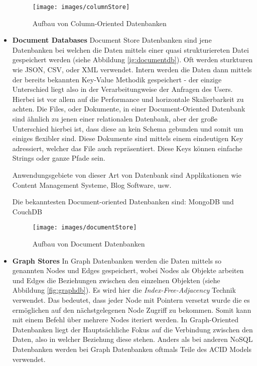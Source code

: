 \begin{itemize}
	\begin{figure}[h]\centering
		\texttt{[image: images/columnStore]}
		\caption{Aufbau von Column-Oriented Datenbanken}
		\label{fig:columnstore}
	\end{figure}


	\item \textbf{Document Databases\newline}
	Document Store Datenbanken sind jene Datenbanken bei welchen die Daten mittels einer quasi strukturiereten Datei gespeichert werden (siehe Abbildung \ref{ig:documentdb}). Oft werden sturkturen wie JSON, CSV, oder XML verwendet. Intern werden die Daten dann mittels der bereits bekannten Key-Value Methodik gespeichert - der einzige Unterschied liegt also in der Verarbeitungweise der Anfragen des Users. Hierbei ist vor allem auf die Performance und horizontale Skalierbarkeit zu achten. Die Files, oder Dokumente, in einer Document-Oriented Datenbank sind ähnlich zu jenen einer relationalen Datenbank, aber der große Unterschied hierbei ist, dass diese an kein Schema gebunden und somit um einiges flexibler sind. Diese Dokumente sind mittels einem eindeutigen Key adressiert, welcher das File auch repräsentiert. Diese Keys können einfache Strings oder ganze Pfade sein.

	Anwendungsgebiete von dieser Art von Datenbank sind Applikationen wie Content Management Systeme, Blog Software, usw. 

	Die bekanntesten Document-oriented Datenbanken sind: MongoDB und CouchDB

	\begin{figure}[h]\centering
		\texttt{[image: images/documentStore]}
		\caption{Aufbau von Document Datenbanken}
		\label{fig:documentdb}
	\end{figure}

	\clearpage

	\item \textbf{Graph Stores\newline}
	In Graph Datenbanken werden die Daten mittels so genannten Nodes und Edges gespeichert, wobei Nodes als Objekte arbeiten und Edges die Beziehungen zwischen den einzelnen Objekten (siehe Abbildung \ref{fig:graphdb}). Es wird hier die \textit{Index-Free-Adjacency} Technik verwendet. Das bedeutet, dass jeder Node mit Pointern versetzt wurde die es ermöglichen auf den nächstgelegenen Node Zugriff zu bekommen. Somit kann mit einem Befehl über mehrere Nodes iteriert werden. In Graph-Oriented Datenbanken liegt der Hauptsächliche Fokus auf die Verbindung zwischen den Daten, also in welcher Beziehung diese stehen. Anders als bei anderen NoSQL Datenbanken werden bei Graph Datenbanken oftmals Teile des ACID Models verwendet.


\end{itemize}
